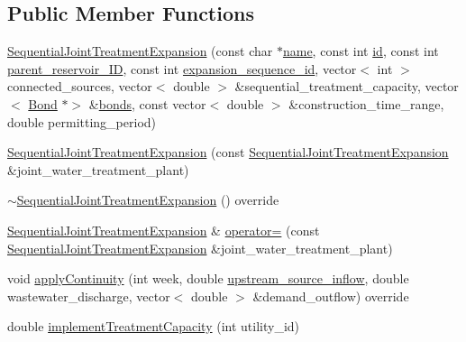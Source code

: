 \subsection*{Public Member Functions}
\begin{DoxyCompactItemize}
\item 
\mbox{\hyperlink{classSequentialJointTreatmentExpansion_ad3ca28eaaa041be6ebbd0a4593d5c9ab_ad3ca28eaaa041be6ebbd0a4593d5c9ab}{Sequential\+Joint\+Treatment\+Expansion}} (const char $\ast$\mbox{\hyperlink{classWaterSource_a846ea74c5b453d014f594d41fee8c765_a846ea74c5b453d014f594d41fee8c765}{name}}, const int \mbox{\hyperlink{classWaterSource_a6eafe5dfefd317877d1244e8a7c6e742_a6eafe5dfefd317877d1244e8a7c6e742}{id}}, const int \mbox{\hyperlink{classSequentialJointTreatmentExpansion_a43b9e27138606bbbf8e5ef0279232a0a_a43b9e27138606bbbf8e5ef0279232a0a}{parent\+\_\+reservoir\+\_\+\+ID}}, const int \mbox{\hyperlink{classSequentialJointTreatmentExpansion_adeaf6ba2bcfc4c024e332764144e3021_adeaf6ba2bcfc4c024e332764144e3021}{expansion\+\_\+sequence\+\_\+id}}, vector$<$ int $>$ connected\+\_\+sources, vector$<$ double $>$ \&sequential\+\_\+treatment\+\_\+capacity, vector$<$ \mbox{\hyperlink{classBond}{Bond}} $\ast$$>$ \&\mbox{\hyperlink{classWaterSource_a413b094e11bdce62f4d82e5bb9e4706e_a413b094e11bdce62f4d82e5bb9e4706e}{bonds}}, const vector$<$ double $>$ \&construction\+\_\+time\+\_\+range, double permitting\+\_\+period)
\item 
\mbox{\hyperlink{classSequentialJointTreatmentExpansion_a677aa8de08ba7116216509b1a6d74b14_a677aa8de08ba7116216509b1a6d74b14}{Sequential\+Joint\+Treatment\+Expansion}} (const \mbox{\hyperlink{classSequentialJointTreatmentExpansion}{Sequential\+Joint\+Treatment\+Expansion}} \&joint\+\_\+water\+\_\+treatment\+\_\+plant)
\item 
\mbox{\hyperlink{classSequentialJointTreatmentExpansion_a77d4270fd89d172739fdede5b9e6c1e9_a77d4270fd89d172739fdede5b9e6c1e9}{$\sim$\+Sequential\+Joint\+Treatment\+Expansion}} () override
\item 
\mbox{\hyperlink{classSequentialJointTreatmentExpansion}{Sequential\+Joint\+Treatment\+Expansion}} \& \mbox{\hyperlink{classSequentialJointTreatmentExpansion_a53413658de78fecdb2e0d451a20eb82c_a53413658de78fecdb2e0d451a20eb82c}{operator=}} (const \mbox{\hyperlink{classSequentialJointTreatmentExpansion}{Sequential\+Joint\+Treatment\+Expansion}} \&joint\+\_\+water\+\_\+treatment\+\_\+plant)
\item 
void \mbox{\hyperlink{classSequentialJointTreatmentExpansion_a64fdd68fc68f6b1145291575c2116815_a64fdd68fc68f6b1145291575c2116815}{apply\+Continuity}} (int week, double \mbox{\hyperlink{classWaterSource_a7a69b2e9b6030f1035e6cf44d2918ee5_a7a69b2e9b6030f1035e6cf44d2918ee5}{upstream\+\_\+source\+\_\+inflow}}, double wastewater\+\_\+discharge, vector$<$ double $>$ \&demand\+\_\+outflow) override
\item 
double \mbox{\hyperlink{classSequentialJointTreatmentExpansion_a06a2e9479bd639661cd8241e571c5711_a06a2e9479bd639661cd8241e571c5711}{implement\+Treatment\+Capacity}} (int utility\+\_\+id)
\end{DoxyCompactItemize}
